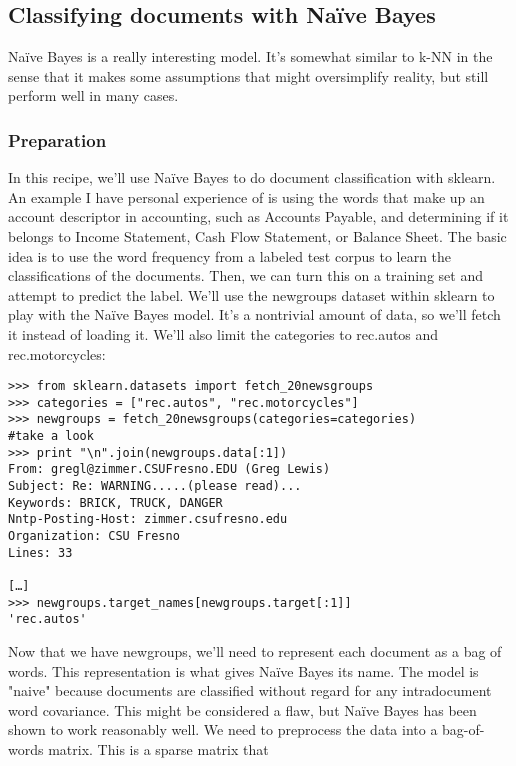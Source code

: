 \subsection{Classifying documents with Naïve Bayes}
Naïve Bayes is a really interesting model. It's somewhat similar to k-NN in the sense that it
makes some assumptions that might oversimplify reality, but still perform well in many cases.

\subsubsection{Preparation} %
In this recipe, we'll use Naïve Bayes to do document classification with sklearn. An example
I have personal experience of is using the words that make up an account descriptor in
accounting, such as Accounts Payable, and determining if it belongs to Income Statement,
Cash Flow Statement, or Balance Sheet.
The basic idea is to use the word frequency from a labeled test corpus to learn the
classifications of the documents. Then, we can turn this on a training set and attempt to
predict the label.
We'll use the newgroups dataset within sklearn to play with the Naïve Bayes model. It's a
nontrivial amount of data, so we'll fetch it instead of loading it. We'll also limit the categories
to rec.autos and rec.motorcycles:
\begin{framed}
\begin{verbatim}
>>> from sklearn.datasets import fetch_20newsgroups
>>> categories = ["rec.autos", "rec.motorcycles"]
>>> newgroups = fetch_20newsgroups(categories=categories)
#take a look
>>> print "\n".join(newgroups.data[:1])
From: gregl@zimmer.CSUFresno.EDU (Greg Lewis)
Subject: Re: WARNING.....(please read)...
Keywords: BRICK, TRUCK, DANGER
Nntp-Posting-Host: zimmer.csufresno.edu
Organization: CSU Fresno
Lines: 33

[…]
>>> newgroups.target_names[newgroups.target[:1]]
'rec.autos'
\end{verbatim}
\end{framed}
Now that we have newgroups, we'll need to represent each document as a bag of words. This
representation is what gives Naïve Bayes its name. The model is "naive" because documents
are classified without regard for any intradocument word covariance. This might be considered
a flaw, but Naïve Bayes has been shown to work reasonably well.
We need to preprocess the data into a bag-of-words matrix. This is a sparse matrix that
